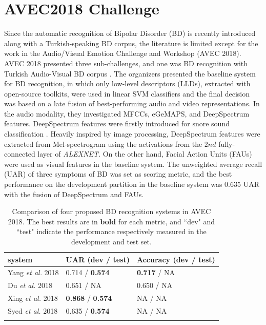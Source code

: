 \section{AVEC2018 Challenge}

Since the automatic recognition of Bipolar Disorder (BD) is recently introduced along with a Turkish-speaking BD corpus, the literature is limited except for the work in the Audio/Visual Emotion Challenge and Workshop (AVEC 2018). AVEC 2018 presented three sub-challenges, and one was BD recognition with Turkish Audio-Visual BD corpus \cite{cciftcci2018}. The organizers \cite{ringeval2018} presented the baseline system for BD recognition, in which only low-level descriptors (LLDs), extracted with open-source toolkits, were used in linear SVM classifiers and the final decision was based on a late fusion of best-performing audio and video representations. In the audio modality, they investigated MFCCs, eGeMAPS, and DeepSpectrum features. DeepSpectrum features were firstly introduced for snore sound classification \cite{amiriparian2017}. Heavily inspired by image processing, DeepSpectrum features were extracted from Mel-spectrogram using the activations from the $2nd$ fully-connected layer of \textit{ALEXNET}. On the other hand, Facial Action Units (FAUs) were used as visual features in the baseline system. The unweighted average recall (UAR) of three symptoms of BD was set as scoring metric, and the best performance on the development partition in the baseline system was 0.635 UAR with the fusion of DeepSpectrum and FAUs.


\begin{table}[htb]
    \centering
    \caption{Comparison of four proposed BD recognition systems in AVEC 2018. The best results are in \textbf{bold} for each metric, and ``dev" and ``test" indicate the performance respectively measured in the development and test set.}
    \begin{tabular}{l|l|l}
        \Xhline{2\arrayrulewidth}
        system & UAR (dev / test) & Accuracy (dev / test) \\
        \hline
        Yang \textit{et al.} 2018 & 0.714 / \textbf{0.574} & \textbf{0.717} / NA \\
        \hline 
        Du \textit{et al.} 2018 & 0.651 / NA & 0.650 / NA \\
        \hline 
        Xing \textit{et al.} 2018 & \textbf{0.868} / \textbf{0.574} & NA / NA \\
        \hline
        Syed \textit{et al.} 2018 & 0.635 / \textbf{0.574} & NA / NA \\
        \Xhline{2\arrayrulewidth}
    \end{tabular}
    \label{tab:four_results}
\end{table}


